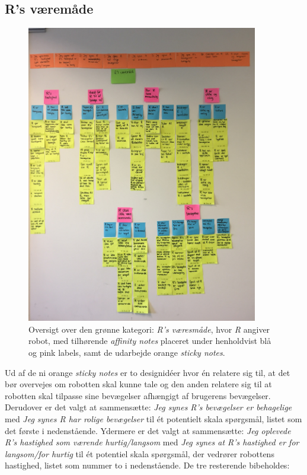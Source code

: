 \subsection{R's væremåde}
\label{ParametreRsVaeremaade}
%
\begin{figure}[H]
\centering
\includegraphics[width = 0.9\textwidth]{Figure/AffinityDiagram/RsVaeremaade} 
\caption{Oversigt over den grønne kategori: \textit{R's væresmåde}, hvor \textit{R} angiver robot, med tilhørende \textit{affinity notes} placeret under henholdvist blå og pink labels, samt de udarbejde orange \textit{sticky notes}.}
\label{fig:AFRsVaeremaade}
\end{figure}
\noindent
%
Ud af de ni orange \textit{sticky notes} er to designidéer hvor én relatere sig til, at det bør overvejes om robotten skal kunne tale og den anden relatere sig til at robotten skal tilpasse sine bevægelser afhængigt af brugerens bevægelser. Derudover er det valgt at sammensætte: \textit{Jeg synes R's bevægelser er behagelige} med \textit{Jeg synes R har rolige bevægelser} til ét potentielt skala spørgsmål, listet som det første i nedenstående. Ydermere er det valgt at sammensætte: \textit{Jeg oplevede R's hastighed som værende hurtig/langsom} med \textit{Jeg synes at R's hastighed er for langsom/for hurtig} til ét potentiel skala spørgsmål, der vedrører robottens hastighed, listet som nummer to i nedenstående. De tre resterende bibeholdes: \blankline 
